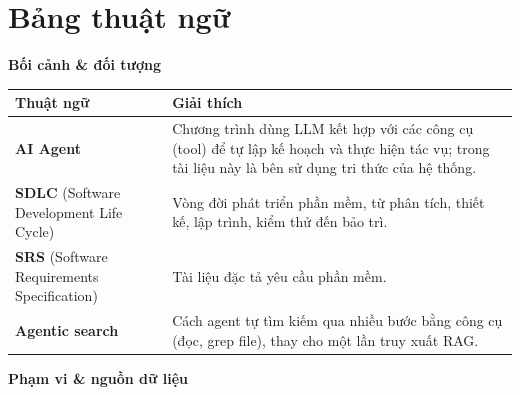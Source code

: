 \section*{Bảng thuật ngữ}

\textbf{Bối cảnh \& đối tượng}

\begin{table}[H]
\centering
\begin{tabular}{p{4cm}p{11cm}}
\toprule
Thuật ngữ & Giải thích \\
\midrule
\textbf{AI Agent} & Chương trình dùng LLM kết hợp với các công cụ (tool) để tự lập kế hoạch và thực hiện tác vụ; trong tài liệu này là bên sử dụng tri thức của hệ thống. \\
\textbf{SDLC} (Software Development Life Cycle) & Vòng đời phát triển phần mềm, từ phân tích, thiết kế, lập trình, kiểm thử đến bảo trì. \\
\textbf{SRS} (Software Requirements Specification) & Tài liệu đặc tả yêu cầu phần mềm. \\
\textbf{Agentic search} & Cách agent tự tìm kiếm qua nhiều bước bằng công cụ (đọc, grep file), thay cho một lần truy xuất RAG. \\
\bottomrule
\end{tabular}
\end{table}

\textbf{Phạm vi \& nguồn dữ liệu}

